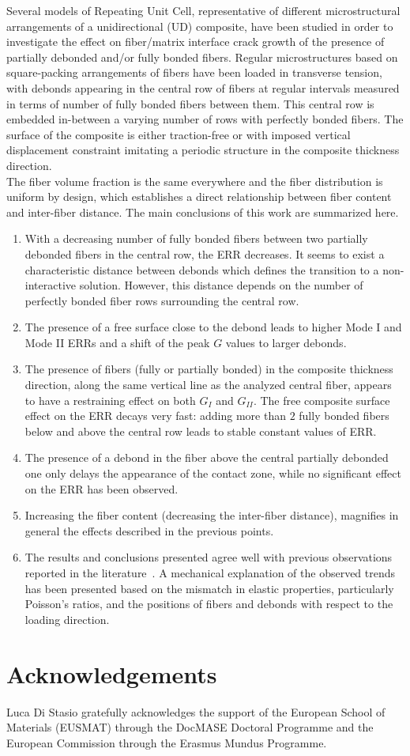 \documentclass[review]{elsarticle}
\begin{document}
Several models of Repeating Unit Cell, representative of different microstructural arrangements of a unidirectional (UD) composite, have been studied in order to investigate the effect on fiber/matrix interface crack growth of the presence of partially debonded and/or fully bonded fibers. Regular microstructures based on square-packing arrangements of fibers have been loaded in transverse tension, with debonds appearing in the central row of fibers at regular intervals measured in terms of number of fully bonded fibers between them. This central row is embedded in-between a varying number of rows with perfectly bonded fibers. The surface of the composite is either traction-free or with imposed vertical displacement constraint imitating a periodic structure in the composite thickness direction.\\
The fiber volume fraction is the same everywhere and the fiber distribution is uniform by design, which establishes a direct relationship between fiber content and inter-fiber distance. The main conclusions of this work are summarized here.
\begin{enumerate}
\item With a decreasing number of fully bonded fibers between two partially debonded fibers in the central row, the ERR decreases. It seems to exist a characteristic distance between debonds which defines the transition to a non-interactive solution. However, this distance depends on the number of perfectly bonded fiber rows surrounding the central row. 
\item The presence of a free surface close to the debond leads to higher Mode I and Mode II ERRs and a shift of the peak $G$ values to larger debonds.
\item The presence of fibers (fully or partially bonded) in the composite thickness direction, along the same vertical line as the analyzed central fiber, appears to have a restraining effect on both $G_{I}$ and $G_{II}$. The free composite surface effect on the ERR decays very fast: adding more than $2$ fully bonded fibers below and above the central row leads to stable constant values of ERR.
\item The presence of a debond in the fiber above the central partially debonded one only delays the appearance of the contact zone, while no significant effect on the ERR has been observed.
\item Increasing the fiber content (decreasing the inter-fiber distance), magnifies in general the effects described in the previous points.
\item The results and conclusions presented agree well with previous observations reported in the literature~\cite{Sandino2016,Zhuang2018}. A mechanical explanation of the observed trends has been presented based on the mismatch in elastic properties, particularly Poisson's ratios, and the positions of fibers and debonds with respect to the loading direction. 
\end{enumerate} 

\section*{Acknowledgements}

Luca Di Stasio gratefully acknowledges the support of the European School of Materials (EUSMAT) through the DocMASE Doctoral Programme and the European Commission through the Erasmus Mundus Programme.


\end{document}
